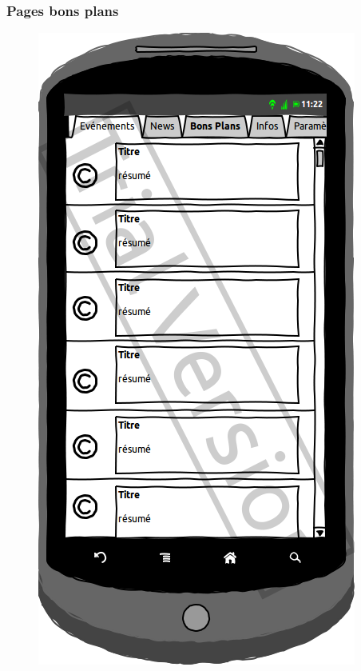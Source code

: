 \documentclass[a4paper, 11px]{article}
\begin{document}
\subsubsection{Pages bons plans}
\begin{figure}[htbp]
	\begin{minipage}[c]{.50\linewidth}
		\begin{center}
			\includegraphics[scale=0.3]{../../Sketch/Android/BP.png}
		\end{center}
	\end{minipage}
	\hfill
	\begin{minipage}[c]{.50\linewidth}
		\begin{center}

\end{center}
\end{minipage}
\end{figure}
\end{document}
